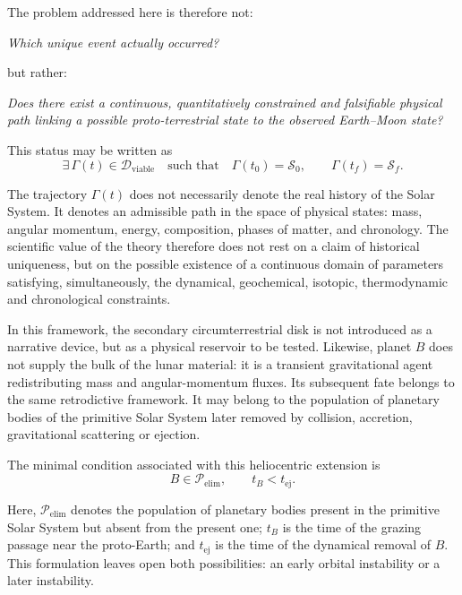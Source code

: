 \documentclass[11pt,a4paper,openany]{report}
\begin{document}
The problem addressed here is therefore not:

\begin{center}
\emph{Which unique event actually occurred?}
\end{center}

but rather:

\begin{center}
\emph{Does there exist a continuous, quantitatively constrained and falsifiable
physical path linking a possible proto-terrestrial state to the observed
Earth--Moon state?}
\end{center}

This status may be written as
\begin{equation}
\boxed{
\exists\,\Gamma(t)\in\mathcal{D}_{\mathrm{viable}}
\quad\text{such that}\quad
\Gamma(t_0)=\mathcal{S}_0,\qquad
\Gamma(t_f)=\mathcal{S}_f .
}
\label{eq:retrodictive-status}
\end{equation}

The trajectory $\Gamma(t)$ does not necessarily denote the real history of the
Solar System. It denotes an admissible path in the space of physical states:
mass, angular momentum, energy, composition, phases of matter, and chronology.
The scientific value of the theory therefore does not rest on a claim of
historical uniqueness, but on the possible existence of a continuous domain of
parameters satisfying, simultaneously, the dynamical, geochemical, isotopic,
thermodynamic and chronological constraints.

In this framework, the secondary circumterrestrial disk is not introduced as a
narrative device, but as a physical reservoir to be tested. Likewise, planet
$B$ does not supply the bulk of the lunar material: it is a
transient gravitational agent redistributing mass and angular-momentum fluxes.
Its subsequent fate belongs to the same retrodictive framework. It may belong
to the population of planetary bodies of the primitive Solar System later
removed by collision, accretion, gravitational scattering or ejection.

The minimal condition associated with this heliocentric extension is
\begin{equation}
\boxed{
B\in\mathcal{P}_{\mathrm{elim}},
\qquad
 t_B<t_{\mathrm{ej}} .
}
\label{eq:B-elim-preamble}
\end{equation}

Here, $\mathcal{P}_{\mathrm{elim}}$ denotes the population of planetary bodies
present in the primitive Solar System but absent from the present one; $t_B$ is
the time of the grazing passage near the proto-Earth; and $t_{\mathrm{ej}}$ is
the time of the dynamical removal of $B$. This formulation leaves open both
possibilities: an early orbital instability or a later instability.
\end{document}
